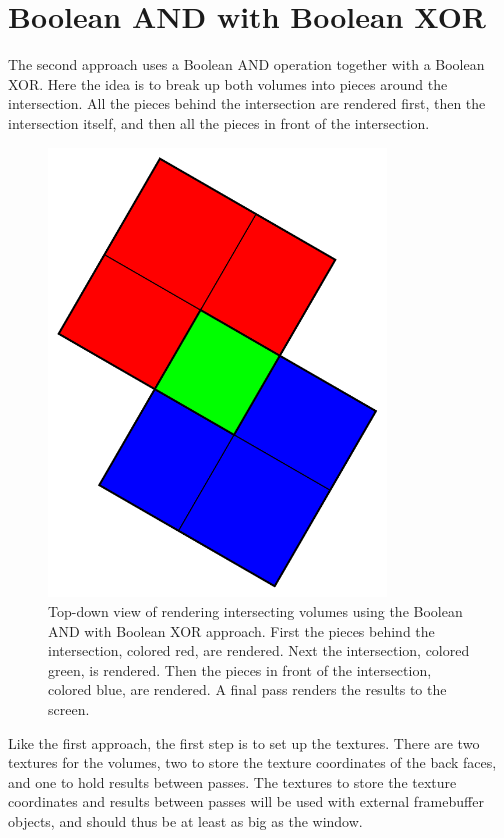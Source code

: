 \documentclass{report}
\begin{document}
\section{Boolean AND with Boolean XOR}

The second approach uses a Boolean AND operation together with a Boolean XOR.
Here the idea is to break up both volumes into pieces around the intersection.
All the pieces behind the intersection are rendered first, then the intersection
itself, and then all the pieces in front of the intersection.

\begin{figure}
\centering
\includegraphics[width=0.8\textwidth]{boolean-xor.pdf}
\caption{
Top-down view of rendering intersecting volumes using the Boolean AND with
Boolean XOR approach.  First the pieces behind the intersection, colored red,
are rendered.  Next the intersection, colored green, is rendered.  Then the
pieces in front of the intersection, colored blue, are rendered.  A final pass
renders the results to the screen.
}
\label{boolean-xor}
\end{figure}

Like the first approach, the first step is to set up the textures.  There are
two textures for the volumes, two to store the texture coordinates of the back
faces, and one to hold results between passes.  The textures to store the
texture coordinates and results between passes will be used with external
framebuffer objects, and should thus be at least as big as the window.
\end{document}
